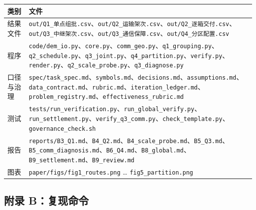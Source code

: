 \documentclass[
  10.5pt,
]{article}
\newcounter{none} %
\begin{document}
{\def\LTcaptype{none} %
\begin{longtable}[]{@{}
  >{\raggedright\arraybackslash}p{}
  >{\raggedright\arraybackslash}p{}@{}}
\toprule\noalign{}
\begin{minipage}[b]{\linewidth}\raggedright
类别
\end{minipage} & \begin{minipage}[b]{\linewidth}\raggedright
文件
\end{minipage} \\
\midrule\noalign{}
\endhead
\bottomrule\noalign{}
\endlastfoot
结果文件 &
\texttt{out/Q1\_单点组批.csv}、\texttt{out/Q2\_运输架次.csv}、\texttt{out/Q2\_逐箱交付.csv}、\texttt{out/Q3\_中继架次.csv}、\texttt{out/Q3\_通信保障.csv}、\texttt{out/Q4\_分区配置.csv} \\
程序 &
\texttt{code/dem\_io.py}、\texttt{core.py}、\texttt{comm\_geo.py}、\texttt{q1\_grouping.py}、\texttt{q2\_schedule.py}、\texttt{q3\_joint.py}、\texttt{q4\_partition.py}、\texttt{verify.py}、\texttt{render.py}、\texttt{q2\_scale\_probe.py}、\texttt{q3\_diagnose.py} \\
口径与治理 &
\texttt{spec/task\_spec.md}、\texttt{symbols.md}、\texttt{decisions.md}、\texttt{assumptions.md}、\texttt{data\_contract.md}、\texttt{rubric.md}、\texttt{iteration\_ledger.md}、\texttt{problem\_registry.md}、\texttt{effectiveness\_rubric.md} \\
测试 &
\texttt{tests/run\_verification.py}、\texttt{run\_global\_verify.py}、\texttt{run\_settlement.py}、\texttt{verify\_q3\_comm.py}、\texttt{check\_template.py}、\texttt{governance\_check.sh} \\
报告 &
\texttt{reports/B3\_Q1.md}、\texttt{B4\_Q2.md}、\texttt{B4\_scale\_probe.md}、\texttt{B5\_Q3.md}、\texttt{B5\_comm\_diagnosis.md}、\texttt{B6\_Q4.md}、\texttt{B8\_global.md}、\texttt{B9\_settlement.md}、\texttt{B9\_review.md} \\
图表 & \texttt{paper/figs/fig1\_routes.png} \ldots{}
\texttt{fig5\_partition.png} \\
\end{longtable}
}

\subsection{附录
B：复现命令}\label{ux9644ux5f55-bux590dux73b0ux547dux4ee4}
\end{document}
